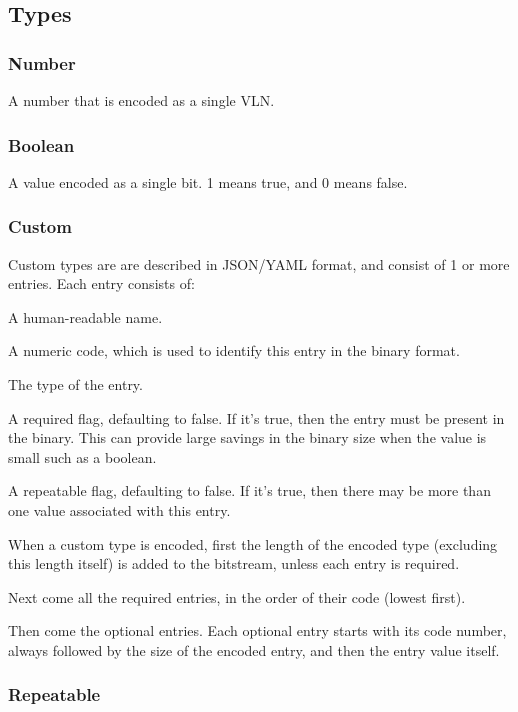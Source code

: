 \subsection{Types}

\subsubsection{Number}

A number that is encoded as a single VLN.

\subsubsection{Boolean}

A value encoded as a single bit. 1 means true, and 0 means false.

\subsubsection{Custom}

\begin{steps}{Custom types are are described in JSON/YAML format, and consist
of 1 or more entries. Each entry consists of:}
\item A human-readable name.
\item A numeric code, which is used to identify this entry in the binary format.
\item The type of the entry.
\item A required flag, defaulting to false. If it's true, then the entry must
be present in the binary. This can provide large savings in the binary size
when the value is small such as a boolean.
\item A repeatable flag, defaulting to false. If it's true, then there may 
be more than one value associated with this entry.
\end{steps}

When a custom type is encoded, first the length of the encoded type
(excluding this length itself) is added to the bitstream, unless each entry
is required.

Next come all the required entries, in the order of their code (lowest
first).

Then come the optional entries. Each optional entry starts with its code
number, always followed by the size of the encoded entry, and then the entry
value itself.

\subsubsection{Repeatable}

